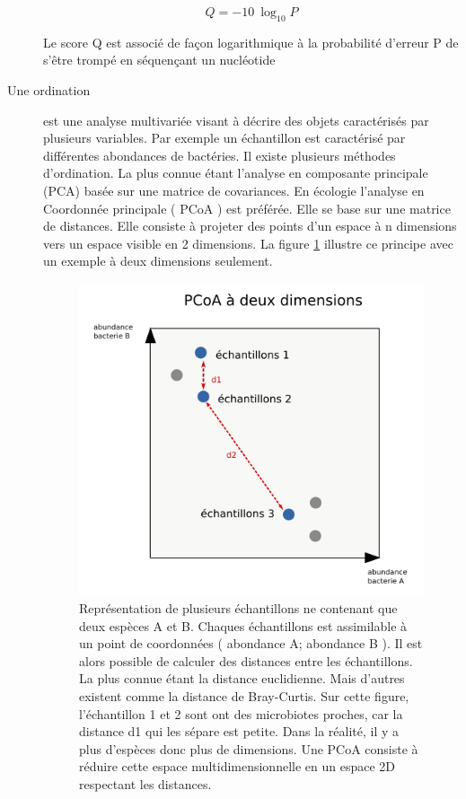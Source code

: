 \documentclass[12pt,a4paper]{article}
\begin{document}
\begin{description}
\begin{mycapequ}[!h]
   \begin{equation}
    Q = -10 \ \log_{10} P 
   \end{equation}
      \caption{Le score Q est associé de façon logarithmique à la probabilité d'erreur P de s'être trompé en séquençant un nucléotide}
\end{mycapequ}




\item[Une ordination] est une analyse multivariée visant à décrire des objets caractérisés par plusieurs variables. Par exemple un échantillon est caractérisé par différentes abondances de bactéries. Il existe plusieurs méthodes d'ordination. La plus connue étant l'analyse en composante principale (PCA) basée sur une matrice de covariances. En écologie l'analyse en Coordonnée principale ( PCoA ) est préférée. Elle se base sur une matrice de distances. Elle consiste à projeter des points d'un espace à n dimensions vers un espace visible en 2 dimensions.
La figure \ref{pcoatuto} illustre ce principe avec un exemple à deux dimensions seulement. 

\begin{figure}[!h]
\begin{center}
\includegraphics[scale=0.6]{img/pcoatuto.png}\hfill
\end{center}
\caption{Représentation de plusieurs échantillons ne contenant que deux espèces A et B. Chaques échantillons est assimilable à un point de coordonnées ( abondance A; abondance B ). Il est alors possible de calculer des distances entre les échantillons. La plus connue étant la distance euclidienne. Mais d'autres existent comme la distance de Bray-Curtis. Sur cette figure, l’échantillon 1 et 2 sont ont des microbiotes proches, car la distance d1 qui les sépare est petite. Dans la réalité, il y a plus d'espèces donc plus de dimensions. Une PCoA consiste à réduire cette espace multidimensionnelle en un espace 2D respectant les distances. }
\label{pcoatuto}
\end{figure}
\newpage


\end{description}
\end{document}
